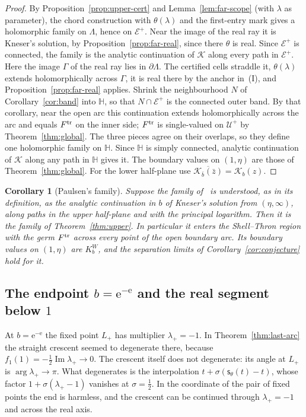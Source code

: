 \documentclass[11pt]{amsart}
\newtheorem{corollary}[theorem]{Corollary}
\theoremstyle{definition}
\newcommand{\Kk}{K}
\newcommand{\eee}{\mathrm{e}}
\begin{document}
\begin{proof}
By Proposition~\ref{prop:upper-cert} and Lemma~\ref{lem:far-scope}
(with $\lambda$ as parameter), the chord construction
with $\theta(\lambda)$ and the first-entry mark gives a holomorphic family on $\Lambda$, hence on
$\mathcal E^+$.  Near the image of the real ray it is Kneser's solution, by
Proposition~\ref{prop:far-real}, since there $\theta$ is real.  Since $\mathcal E^+$ is connected,
the family is the analytic continuation of $\mathcal K$ along every path in $\mathcal E^+$.  Here the
image $\Gamma$ of the real ray lies in $\partial\Lambda$.  The certified cells straddle it,
$\theta(\lambda)$ extends holomorphically across $\Gamma$, it is real there by the anchor
in~(I), and Proposition~\ref{prop:far-real} applies.  Shrink the neighbourhood $N$
of Corollary~\ref{cor:band} into $\mathbb H$, so that $N\cap\mathcal E^+$ is the connected outer band.  By
that corollary, near the open arc this continuation extends
holomorphically across the arc and equals $F^{\rm tr}$ on the inner side; $F^{\rm tr}$ is
single-valued on $\mathcal U^+$ by Theorem~\ref{thm:global}.  The three pieces agree on
their overlaps, so they define one holomorphic family on $\mathbb H$.  Since $\mathbb H$ is
simply connected, analytic continuation of $\mathcal K$ along any path in $\mathbb H$ gives it.
The boundary values on $(1,\eta)$ are those of Theorem~\ref{thm:global}.  For the lower
half-plane use $\overline{\mathcal K_{\bar b}(\bar z)}=\mathcal K_b(z)$.
\end{proof}

\begin{corollary}[Paulsen's family]\label{cor:paulsen}
Suppose the family of~\cite{Paulsen2019} is understood, as in its definition, as the
analytic continuation in $b$ of Kneser's solution from $(\eta,\infty)$, along paths
in the upper half-plane and with the principal logarithm.  Then it is the family of
Theorem~\ref{thm:upper}.  In particular it enters the Shell--Thron region with the
germ $F^{\rm tr}$ across every point of the open boundary arc.  Its boundary values on
$(1,\eta)$ are $\Kk^W_b$, and the separation limits of
Corollary~\ref{cor:conjecture} hold for it.
\end{corollary}

\subsection{The endpoint $b=\eee^{-\eee}$ and the real segment below $1$}\label{sec:endpoint}
At $b=\eee^{-\eee}$ the fixed point $L_+$ has multiplier $\lambda_+=-1$.  In
Theorem~\ref{thm:last-arc} the straight crescent seemed to degenerate there, because
$f_1(1)=-\tfrac12\operatorname{Im}\lambda_+\to0$.  The crescent itself does not degenerate: its angle at
$L_+$ is $\arg\lambda_+\to\pi$.  What degenerates is the interpolation $t+\sigma(\mathsf s_\theta(t)-t)$,
whose factor $1+\sigma(\lambda_+-1)$ vanishes at $\sigma=\tfrac12$.  In the coordinate of the pair of
fixed points the end is harmless, and the crescent can be continued through
$\lambda_+=-1$ and across the real axis.
\end{document}
